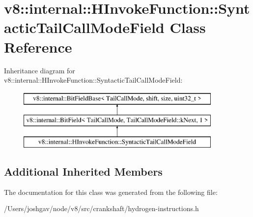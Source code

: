 \hypertarget{classv8_1_1internal_1_1_h_invoke_function_1_1_syntactic_tail_call_mode_field}{}\section{v8\+:\+:internal\+:\+:H\+Invoke\+Function\+:\+:Syntactic\+Tail\+Call\+Mode\+Field Class Reference}
\label{classv8_1_1internal_1_1_h_invoke_function_1_1_syntactic_tail_call_mode_field}
Inheritance diagram for v8\+:\+:internal\+:\+:H\+Invoke\+Function\+:\+:Syntactic\+Tail\+Call\+Mode\+Field\+:\begin{figure}[H]
\begin{center}
\leavevmode
\includegraphics[height=3.000000cm]{classv8_1_1internal_1_1_h_invoke_function_1_1_syntactic_tail_call_mode_field}
\end{center}
\end{figure}
\subsection*{Additional Inherited Members}


The documentation for this class was generated from the following file\+:\begin{DoxyCompactItemize}
\item 
/\+Users/joshgav/node/v8/src/crankshaft/hydrogen-\/instructions.\+h\end{DoxyCompactItemize}
